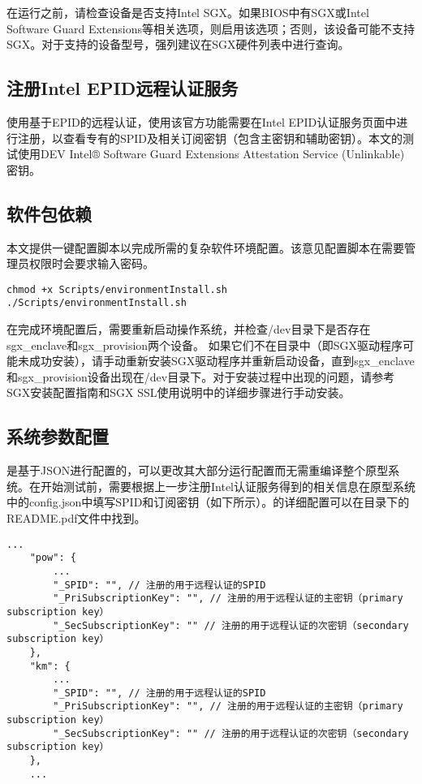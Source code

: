 在运行\prototype 之前，请检查设备是否支持Intel SGX。如果BIOS中有SGX或Intel Software Guard Extensions等相关选项，则启用该选项；否则，该设备可能不支持SGX。对于支持的设备型号，强列建议在SGX硬件列表\cite{sgxHardware}中进行查询。

\subsection*{注册Intel EPID远程认证服务}

\prototype 使用基于EPID的远程认证，使用该官方功能需要在Intel EPID认证服务\cite{sgxEPID}页面中进行注册，以查看专有的SPID及相关订阅密钥（包含主密钥和辅助密钥）。本文的测试使用DEV Intel® Software Guard Extensions Attestation Service (Unlinkable)密钥。

\subsection*{软件包依赖}
本文提供一键配置脚本以完成\prototype 所需的复杂软件环境配置。该意见配置脚本在需要管理员权限时会要求输入密码。

\begin{lstlisting}[style=shell]
chmod +x Scripts/environmentInstall.sh
./Scripts/environmentInstall.sh
\end{lstlisting}

在完成环境配置后，需要重新启动操作系统，并检查/dev目录下是否存在sgx\_enclave和sgx\_provision两个设备。 如果它们不在目录中（即SGX驱动程序可能未成功安装），请手动重新安装SGX驱动程序并重新启动设备，直到sgx\_enclave和sgx\_provision设备出现在/dev目录下。对于安装过程中出现的问题，请参考SGX安装配置指南\cite{sgxinstall}和SGX SSL\cite{sgxssl}使用说明中的详细步骤进行手动安装。

\subsection*{系统参数配置}

\prototype 是基于JSON进行配置的，可以更改其大部分运行配置而无需重编译整个原型系统。在开始测试前，需要根据上一步注册Intel认证服务得到的相关信息在原型系统中的config.json中填写SPID和订阅密钥（如下所示）。\prototype 的详细配置可以在\prototype 目录下的README.pdf文件中找到。

\begin{lstlisting}[style=json]
    ...
    "pow": {
        ...
        "_SPID": "", // 注册的用于远程认证的SPID
        "_PriSubscriptionKey": "", // 注册的用于远程认证的主密钥（primary subscription key）
        "_SecSubscriptionKey": "" // 注册的用于远程认证的次密钥（secondary subscription key）
    },
    "km": {
        ...
        "_SPID": "", // 注册的用于远程认证的SPID
        "_PriSubscriptionKey": "", // 注册的用于远程认证的主密钥（primary subscription key）
        "_SecSubscriptionKey": "" // 注册的用于远程认证的次密钥（secondary subscription key）
    },
    ...
\end{lstlisting}

